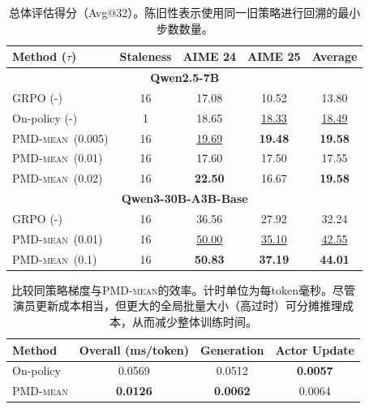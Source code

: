\documentclass{article}
\theoremstyle{plain}
\theoremstyle{definition}
\theoremstyle{remark}
\newcommand{\pmdmean}{\textsc{PMD-mean}}
\begin{document}
\begin{table}[t]
    \caption{总体评估得分（Avg@32）。陈旧性表示使用同一旧策略进行回溯的最小步数数量。}
    \label{tab:main-results}
    \begin{center}\small
                \begin{tabular}{lcccc}
                \toprule
                \textbf{Method ($\tau$)} & \textbf{Staleness} & \textbf{AIME 24} & \textbf{AIME 25} & \textbf{Average} \\
                \midrule
                \multicolumn{5}{c}{\textbf{Qwen2.5-7B}} \\
                \midrule
                GRPO (-) & 16 & 17.08 & 10.52 & 13.80 \\
                On-policy (-) & 1 & 18.65 & \underline{18.33} & \underline{18.49} \\
                \pmdmean\ (0.005) & 16 & \underline{19.69} & \textbf{19.48} & \textbf{19.58} \\
                \pmdmean\ (0.01) & 16 & 17.60 & 17.50 & 17.55 \\
                \pmdmean\ (0.02) & 16 & \textbf{22.50} & 16.67 & \textbf{19.58} \\
                \midrule
                \multicolumn{5}{c}{\textbf{Qwen3-30B-A3B-Base}} \\
                \midrule
                GRPO (-) & 16 & 36.56 & 27.92 & 32.24 \\
                \pmdmean\ (0.01) & 16 & \underline{50.00} & \underline{35.10} & \underline{42.55} \\
                \pmdmean\ (0.1) & 16 & \textbf{50.83} & \textbf{37.19} & \textbf{44.01} \\
                \bottomrule
                \end{tabular}
    \end{center}
\end{table}

\begin{table}[tb]
    \caption{比较同策略梯度与\textsc{PMD-mean}的效率。计时单位为每token毫秒。尽管演员更新成本相当，但更大的全局批量大小（高过时）可分摊推理成本，从而减少整体训练时间。}
    \label{tab:efficiency_comparison}
    \begin{center}\small
                \begin{tabular}{lccc}
                \toprule
                \textbf{Method} & \textbf{Overall (ms/token)} & \textbf{Generation} & \textbf{Actor Update} \\
                \midrule
                On-policy & 0.0569 & 0.0512 & \textbf{0.0057} \\
                \pmdmean & \textbf{0.0126} & \textbf{0.0062} & 0.0064 \\
                \bottomrule
                \end{tabular}
    \end{center}
\end{table}
\end{document}
